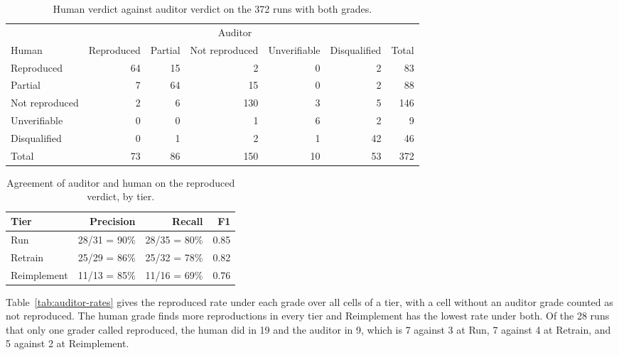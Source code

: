 \begin{table}[ht]
\centering
\small
\begin{tabular}{@{}lrrrrrr@{}}
\toprule
& \multicolumn{5}{c}{Auditor} & \\
\cmidrule(lr){2-6}
Human & Reproduced & Partial & Not reproduced & Unverifiable & Disqualified & Total \\
\midrule
Reproduced     & 64 & 15 &   2 & 0 &  2 &  83 \\
Partial        &  7 & 64 &  15 & 0 &  2 &  88 \\
Not reproduced &  2 &  6 & 130 & 3 &  5 & 146 \\
Unverifiable   &  0 &  0 &   1 & 6 &  2 &   9 \\
Disqualified   &  0 &  1 &   2 & 1 & 42 &  46 \\
\midrule
Total          & 73 & 86 & 150 & 10 & 53 & 372 \\
\bottomrule
\end{tabular}
\caption{Human verdict against auditor verdict on the 372 runs with both grades.}
\label{tab:auditor-confusion}
\end{table}

\begin{table}[ht]
\centering
\small
\begin{tabular}{@{}lrrr@{}}
\toprule
Tier & Precision & Recall & F1 \\
\midrule
Run         & 28/31 = 90\% & 28/35 = 80\% & 0.85 \\
Retrain     & 25/29 = 86\% & 25/32 = 78\% & 0.82 \\
Reimplement & 11/13 = 85\% & 11/16 = 69\% & 0.76 \\
\bottomrule
\end{tabular}
\caption{Agreement of auditor and human on the reproduced verdict, by tier.}
\label{tab:auditor-tier}
\end{table}

Table~\ref{tab:auditor-rates} gives the reproduced rate under each grade over
all cells of a tier, with a cell without an auditor grade counted as not
reproduced. The human grade finds more reproductions in every tier and
Reimplement has the lowest rate under both. Of the 28 runs that only one grader called
reproduced, the human did in 19 and the auditor in 9, which is 7 against 3 at
Run, 7 against 4 at Retrain, and 5 against 2 at Reimplement.

